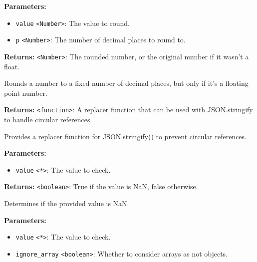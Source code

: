 \documentclass[12pt,a4paper]{article}
\begin{document}
\noindent \textbf{Parameters:}
\begin{itemize}
  \item \texttt{value} \texttt{<Number>}: The value to round.
  \item \texttt{p} \texttt{<Number>}: The number of decimal places to round to.
\end{itemize}

\noindent \textbf{Returns:} \texttt{<Number>}: The rounded number, or the original number if it wasn't a float.

\noindent Rounds a number to a fixed number of decimal places, but only if it's a floating point number.

\vspace{5mm}
\noindent {}


\noindent \textbf{Returns:} \texttt{<function>}: A replacer function that can be used with JSON.stringify to handle circular references.

\noindent Provides a replacer function for JSON.stringify() to prevent circular references.

\vspace{5mm}
\noindent {}


\noindent \textbf{Parameters:}
\begin{itemize}
  \item \texttt{value} \texttt{<*>}: The value to check.
\end{itemize}

\noindent \textbf{Returns:} \texttt{<boolean>}: True if the value is NaN, false otherwise.

\noindent Determines if the provided value is NaN.

\vspace{5mm}
\noindent {}


\noindent \textbf{Parameters:}
\begin{itemize}
  \item \texttt{value} \texttt{<*>}: The value to check.
  \item \texttt{ignore\_array} \texttt{<boolean>}: Whether to consider arrays as not objects.
\end{itemize}
\end{document}
